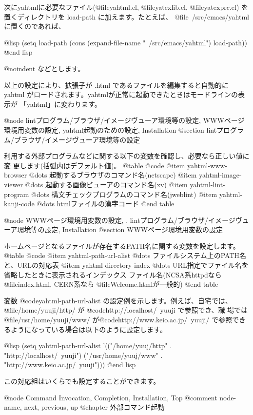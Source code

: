 次にyahtmlに必要なファイル(@file{yahtml.el}, @file{yatexlib.el},
@file{yatexprc.el}) を置くディレクトリを load-path に加えます。たとえば、 
@file{~/src/emacs/yahtml}に置くのであれば、

@lisp
(setq load-path (cons (expand-file-name "~/src/emacs/yahtml") load-path))
@end lisp

@noindent 
などとします。

  以上の設定により、拡張子が .html であるファイルを編集すると自動的に
yahtml がロードされます。yahtmlが正常に起動できたときはモードラインの表示が
「yahtml」に変わります。

@node lintプログラム/ブラウザ/イメージヴューア環境等の設定, WWWページ環境用変数の設定, yahtml起動のための設定, Installation
@section lintプログラム/ブラウザ/イメージヴューア環境等の設定

利用する外部プログラムなどに関する以下の変数を確認し、必要なら正しい値に変
更します(括弧内はデフォルト値)。
@table @code
@item yahtml-www-browser
        @dots{} 起動するブラウザのコマンド名(netscape)
@item yahtml-image-viewer
        @dots{} 起動する画像ビューアのコマンド名(xv)
@item yahtml-lint-program
        @dots{} 構文チェックプログラムのコマンド名(jweblint)
@item yahtml-kanji-code
        @dots{} htmlファイルの漢字コード
@end table

@node WWWページ環境用変数の設定,  , lintプログラム/ブラウザ/イメージヴューア環境等の設定, Installation
@section WWWページ環境用変数の設定

ホームページとなるファイルが存在するPATH名に関する変数を設定します。
@table @code
@item yahtml-path-url-alist
        @dots{} ファイルシステム上のPATH名と、URLの対応表
@item yahtml-directory-index
        @dots{} URL指定でファイル名を省略したときに表示されるインデックス
                ファイル名(NCSA系httpdなら @file{index.html}, CERN系なら
                @file{Welcome.html}が一般的)
@end table

変数 @code{yahtml-path-url-alist} の設定例を示します。例えば、自宅では、
@file{/home/yuuji/http/} が @code{http://localhost/~yuuji} で参照でき、職
場では @file{/usr/home/yuuji/www/} が@code{http://www.keio.ac.jp/~yuuji/} 
で参照できるようになっている場合は以下のように設定します。

@lisp
(setq yahtml-path-url-alist
      '(("/home/yuuj/http" . "http://localhost/~yuuji")
        ("/usr/home/yuuj/www" . "http://www.keio.ac.jp/~yuuji")))
@end lisp

この対応組はいくらでも設定することができます。

@node Command Invocation, Completion, Installation, Top
@comment  node-name,  next,  previous,  up
@chapter 外部コマンド起動

